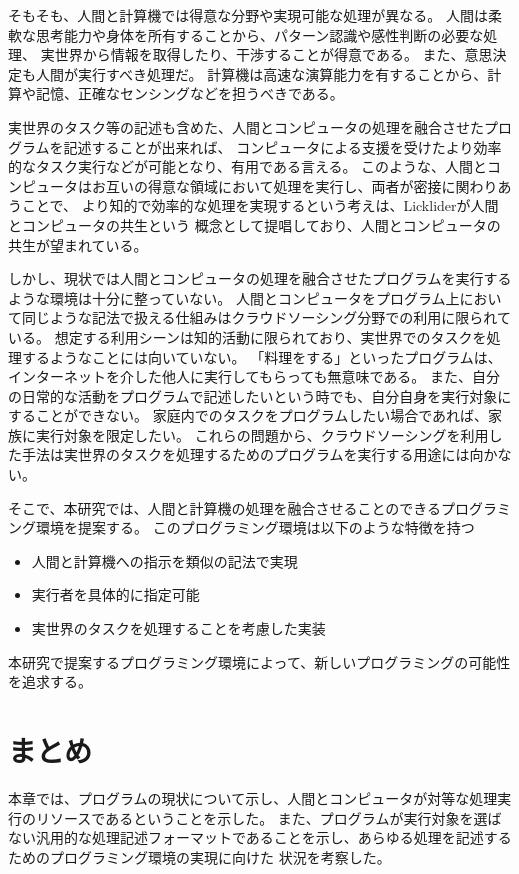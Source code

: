 そもそも、人間と計算機では得意な分野や実現可能な処理が異なる。
人間は柔軟な思考能力や身体を所有することから、パターン認識や感性判断の必要な処理、
実世界から情報を取得したり、干渉することが得意である。
また、意思決定も人間が実行すべき処理だ。
計算機は高速な演算能力を有することから、計算や記憶、正確なセンシングなどを担うべきである。

実世界のタスク等の記述も含めた、人間とコンピュータの処理を融合させたプログラムを記述することが出来れば、
コンピュータによる支援を受けたより効率的なタスク実行などが可能となり、有用である言える。
このような、人間とコンピュータはお互いの得意な領域において処理を実行し、両者が密接に関わりあうことで、
より知的で効率的な処理を実現するという考えは、Lickliderが人間とコンピュータの共生\cite{man-computer-symbiosis}という
概念として提唱しており、人間とコンピュータの共生が望まれている。

しかし、現状では人間とコンピュータの処理を融合させたプログラムを実行するような環境は十分に整っていない。
人間とコンピュータをプログラム上において同じような記法で扱える仕組みはクラウドソーシング分野での利用に限られている。
想定する利用シーンは知的活動に限られており、実世界でのタスクを処理するようなことには向いていない。
「料理をする」といったプログラムは、インターネットを介した他人に実行してもらっても無意味である。
また、自分の日常的な活動をプログラムで記述したいという時でも、自分自身を実行対象にすることができない。
家庭内でのタスクをプログラムしたい場合であれば、家族に実行対象を限定したい。
これらの問題から、クラウドソーシングを利用した手法は実世界のタスクを処理するためのプログラムを実行する用途には向かない。

そこで、本研究では、人間と計算機の処理を融合させることのできるプログラミング環境を提案する。
このプログラミング環境は以下のような特徴を持つ

\begin{itemize}
\itemsep1pt\parskip0pt
\item
  人間と計算機への指示を類似の記法で実現
\item
  実行者を具体的に指定可能
\item
  実世界のタスクを処理することを考慮した実装
\end{itemize}

本研究で提案するプログラミング環境によって、新しいプログラミングの可能性を追求する。

\section{まとめ}\label{ux307eux3068ux3081}

本章では、プログラムの現状について示し、人間とコンピュータが対等な処理実行のリソースであるということを示した。
また、プログラムが実行対象を選ばない汎用的な処理記述フォーマットであることを示し、あらゆる処理を記述するためのプログラミング環境の実現に向けた
状況を考察した。
